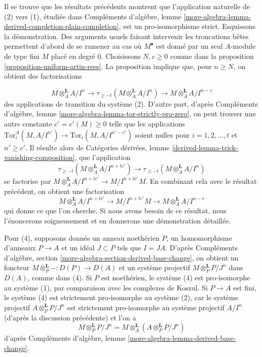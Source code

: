 \begin{remark}
\medskip\noindent
Il se trouve que les résultats précédents montrent que l'application naturelle de (2) vers (1), étudiée dans Compléments d'algèbre, lemme \ref{more-algebra-lemma-derived-completion-plain-completion}, est un pro-isomorphisme strict. Esquissons la démonstration. Des arguments usuels faisant intervenir les troncations bêtes permettent d'abord de se ramener au cas où $M^\bullet$ est donné par un seul $A$-module de type fini $M$ placé en degré $0$. Choisissons $N, c \geq 0$ comme dans la proposition \ref{proposition-uniform-artin-rees}. La proposition implique que, pour $n \geq N$, on obtient des factorisations

$$
M \otimes_A^\mathbf{L} A/I^n
\to
\tau_{\geq -t}(M \otimes_A^\mathbf{L} A/I^n)
\to
M \otimes_A^\mathbf{L} A/I^{n - c}
$$
des applications de transition du système (2). D'autre part, d'après Compléments d'algèbre, lemme \ref{more-algebra-lemma-tor-strictly-pro-zero}, on peut trouver une autre constante $c' = c'(M) \geq 0$ telle que les applications $\text{Tor}_i^A(M, A/I^{n'}) \to \text{Tor}_i(M, A/I^{n' - c'})$ soient nulles pour $i = 1, 2, \ldots, t$ et $n' \geq c'$. Il résulte alors de Catégories dérivées, lemme \ref{derived-lemma-trick-vanishing-composition}, que l'application
$$
\tau_{\geq -t}(M \otimes_A^\mathbf{L} A/I^{n + tc'})
\to
\tau_{\geq -t}(M \otimes_A^\mathbf{L} A/I^n)
$$
se factorise par $M \otimes_A^\mathbf{L}A/I^{n + tc'} \to M/I^{n + tc'}M$. En combinant cela avec le résultat précédent, on obtient une factorisation
$$
M \otimes_A^\mathbf{L}A/I^{n + tc'} \to M/I^{n + tc'}M
\to M \otimes_A^\mathbf{L} A/I^{n - c}
$$
qui donne ce que l'on cherche. Si nous avons besoin de ce résultat, nous l'énoncerons soigneusement et en donnerons une démonstration détaillée.

\medskip\noindent
Pour (4), supposons donnés un anneau noethérien $P$, un homomorphisme d'anneaux $P \to A$ et un idéal $J \subset P$ tels que $I = JA$. D'après Compléments d'algèbre, section \ref{more-algebra-section-derived-base-change}, on obtient un foncteur $M \otimes_P^\mathbf{L} - : D(P) \to D(A)$ et un système projectif $M \otimes_P^\mathbf{L} P/J^n$ dans $D(A)$, comme dans (4). Si $P$ est noethérien, le système (4) est pro-isomorphe au système (1), par comparaison avec les complexes de Koszul. Si $P \to A$ est fini, le système (4) est strictement pro-isomorphe au système (2), car le système projectif $A \otimes_P^\mathbf{L} P/J^n$ est strictement pro-isomorphe au système projectif $A/I^n$ (d'après la discussion précédente) et l'on a
$$
M \otimes_P^\mathbf{L} P/J^n = M \otimes_A^\mathbf{L}
(A \otimes_P^\mathbf{L} P/J^n)
$$
d'après Compléments d'algèbre, lemme \ref{more-algebra-lemma-derived-base-change}.


\end{remark}
